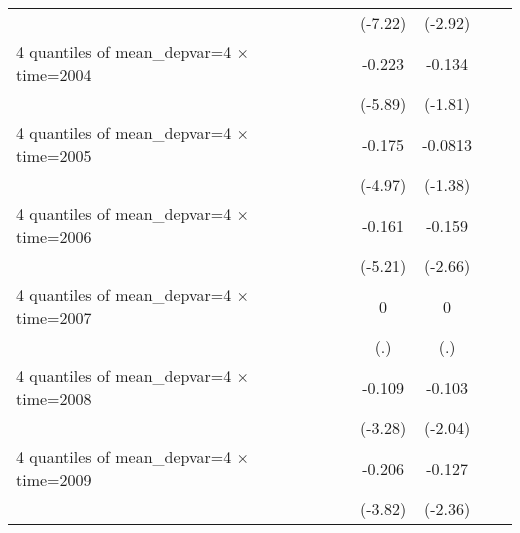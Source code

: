 \begin{table}[htbp]
\begin{tabular}{l*{6}{c}}
                    &                     &                     &     (-7.22)         &     (-2.92)         &                     &                     \\
[1em]
4 quantiles of mean\_depvar=4 $\times$ time=2004&                     &                     &      -0.223\sym{***}&      -0.134\sym{*}  &                     &                     \\
                    &                     &                     &     (-5.89)         &     (-1.81)         &                     &                     \\
[1em]
4 quantiles of mean\_depvar=4 $\times$ time=2005&                     &                     &      -0.175\sym{***}&     -0.0813         &                     &                     \\
                    &                     &                     &     (-4.97)         &     (-1.38)         &                     &                     \\
[1em]
4 quantiles of mean\_depvar=4 $\times$ time=2006&                     &                     &      -0.161\sym{***}&      -0.159\sym{**} &                     &                     \\
                    &                     &                     &     (-5.21)         &     (-2.66)         &                     &                     \\
[1em]
4 quantiles of mean\_depvar=4 $\times$ time=2007&                     &                     &           0         &           0         &                     &                     \\
                    &                     &                     &         (.)         &         (.)         &                     &                     \\
[1em]
4 quantiles of mean\_depvar=4 $\times$ time=2008&                     &                     &      -0.109\sym{***}&      -0.103\sym{*}  &                     &                     \\
                    &                     &                     &     (-3.28)         &     (-2.04)         &                     &                     \\
[1em]
4 quantiles of mean\_depvar=4 $\times$ time=2009&                     &                     &      -0.206\sym{***}&      -0.127\sym{**} &                     &                     \\
                    &                     &                     &     (-3.82)         &     (-2.36)         &                     &                     \\

\end{tabular}
\end{table}
